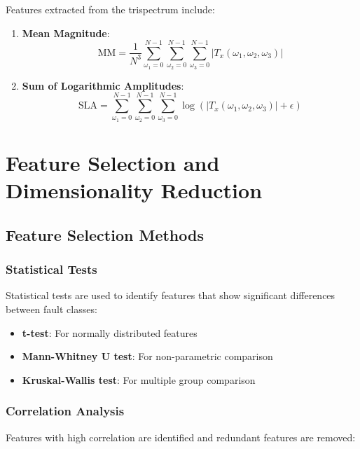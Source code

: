 Features extracted from the trispectrum include:

\begin{enumerate}
    \item \textbf{Mean Magnitude}:
    \begin{equation}
    \text{MM} = \frac{1}{N^3} \sum_{\omega_1=0}^{N-1} \sum_{\omega_2=0}^{N-1} \sum_{\omega_3=0}^{N-1} |T_x(\omega_1, \omega_2, \omega_3)|
    \end{equation}
    
    \item \textbf{Sum of Logarithmic Amplitudes}:
    \begin{equation}
    \text{SLA} = \sum_{\omega_1=0}^{N-1} \sum_{\omega_2=0}^{N-1} \sum_{\omega_3=0}^{N-1} \log(|T_x(\omega_1, \omega_2, \omega_3)| + \epsilon)
    \end{equation}
\end{enumerate}

\section{Feature Selection and Dimensionality Reduction}

\subsection{Feature Selection Methods}

\subsubsection{Statistical Tests}

Statistical tests are used to identify features that show significant differences between fault classes:

\begin{itemize}
    \item \textbf{t-test}: For normally distributed features
    \item \textbf{Mann-Whitney U test}: For non-parametric comparison
    \item \textbf{Kruskal-Wallis test}: For multiple group comparison
\end{itemize}

\subsubsection{Correlation Analysis}

Features with high correlation are identified and redundant features are removed:

